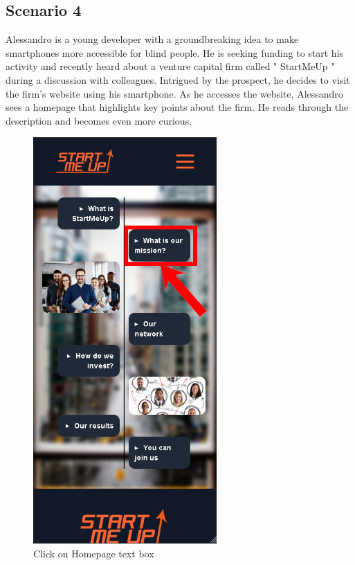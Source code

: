 \documentclass[11pt, letterpaper]{article}
\begin{document}
\subsection{Scenario 4}
Alessandro is a young developer with a groundbreaking idea to make smartphones more accessible for blind people. He is seeking funding to start his activity and recently heard about a venture capital firm called " StartMeUp " during a discussion with colleagues. Intrigued by the prospect, he decides to visit the firm's website using his smartphone.
As he accesses the website, Alessandro sees a homepage that highlights key points about the firm. He reads through the description and becomes even more curious.
\begin{figure}[H]
  \centering
  \begin{minipage}[b]{0.4\textwidth}
    \includegraphics[width=7cm]{images/Scenarios/Scenario4/Screen1.png}
    \caption{Click on Homepage text box}
    \label{fig:scenario4_1}
  \end{minipage}
  \hfill
  \begin{minipage}[b]{0.4\textwidth}

\end{minipage}
\end{figure}
\end{document}
